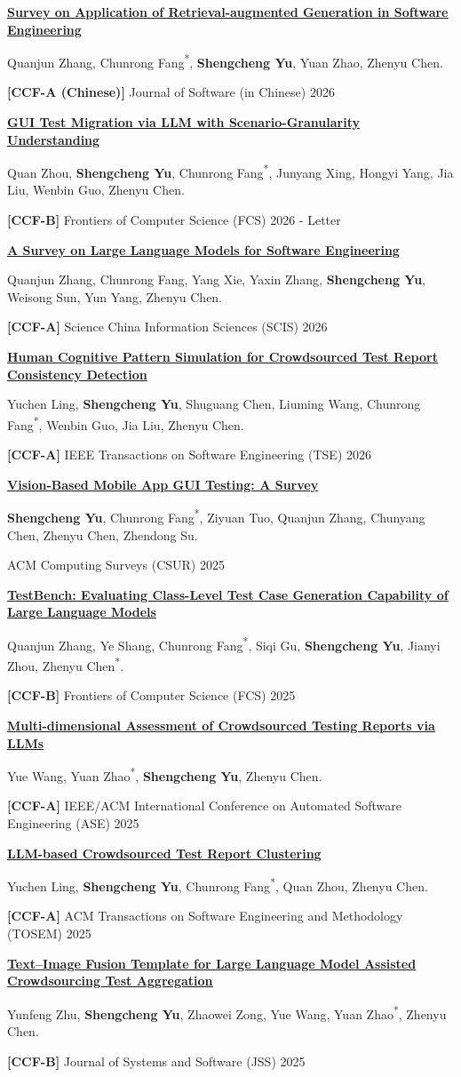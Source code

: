 \documentclass[12pt,a4paper]{article}
\newcommand{\me}{\textbf{Shengcheng Yu}}
\newcommand{\corr}{\textsuperscript{*}}
\newcommand{\ccf}[1]{\textbf{[#1]}}
\newcommand{\publication}[5]{%
  \begin{samepage}%
  \href{#5}{\textbf{\uline{#1}}}#2\par\nopagebreak[4]
  #3.\par\nopagebreak[4]
  #4\par
  \end{samepage}%
  \vspace{4.8pt}%
}
\begin{document}
\publication
{Survey on Application of Retrieval-augmented Generation in Software Engineering}
{}
{Quanjun Zhang, Chunrong Fang\corr, \me, Yuan Zhao, Zhenyu Chen}
{\ccf{CCF-A (Chinese)} Journal of Software (in Chinese) 2026}
{https://www.jos.org.cn/jos/article/abstract/7567}

\publication
{GUI Test Migration via LLM with Scenario-Granularity Understanding}
{}
{Quan Zhou, \me, Chunrong Fang\corr, Junyang Xing, Hongyi Yang, Jia Liu, Wenbin Guo, Zhenyu Chen}
{\ccf{CCF-B} Frontiers of Computer Science (FCS) 2026 - Letter}
{https://doi.org/10.1007/s11704-025-50270-x}

\publication
{A Survey on Large Language Models for Software Engineering}
{}
{Quanjun Zhang, Chunrong Fang, Yang Xie, Yaxin Zhang, \me, Weisong Sun, Yun Yang, Zhenyu Chen}
{\ccf{CCF-A} Science China Information Sciences (SCIS) 2026}
{https://doi.org/10.1007/s11432-025-4670-0}

\publication
{Human Cognitive Pattern Simulation for Crowdsourced Test Report Consistency Detection}
{}
{Yuchen Ling, \me, Shuguang Chen, Liuming Wang, Chunrong Fang\corr, Wenbin Guo, Jia Liu, Zhenyu Chen}
{\ccf{CCF-A} IEEE Transactions on Software Engineering (TSE) 2026}
{https://doi.org/10.1109/TSE.2026.3659293}

\publication
{Vision-Based Mobile App GUI Testing: A Survey}
{}
{\me, Chunrong Fang\corr, Ziyuan Tuo, Quanjun Zhang, Chunyang Chen, Zhenyu Chen, Zhendong Su}
{ACM Computing Surveys (CSUR) 2025}
{https://doi.org/10.1145/3773027}

\publication
{TestBench: Evaluating Class-Level Test Case Generation Capability of Large Language Models}
{}
{Quanjun Zhang, Ye Shang, Chunrong Fang\corr, Siqi Gu, \me, Jianyi Zhou, Zhenyu Chen\corr}
{\ccf{CCF-B} Frontiers of Computer Science (FCS) 2025}
{https://journal.hep.com.cn/fcs/EN/10.1007/s11704-025-50078-9}

\publication
{Multi-dimensional Assessment of Crowdsourced Testing Reports via LLMs}
{}
{Yue Wang, Yuan Zhao\corr, \me, Zhenyu Chen}
{\ccf{CCF-A} IEEE/ACM International Conference on Automated Software Engineering (ASE) 2025}
{https://doi.org/10.1109/ASE63991.2025.00150}

\publication
{LLM-based Crowdsourced Test Report Clustering}
{}
{Yuchen Ling, \me, Chunrong Fang\corr, Quan Zhou, Zhenyu Chen}
{\ccf{CCF-A} ACM Transactions on Software Engineering and Methodology (TOSEM) 2025}
{https://doi.org/10.1145/3765756}

\publication
{Text--Image Fusion Template for Large Language Model Assisted Crowdsourcing Test Aggregation}
{}
{Yunfeng Zhu, \me, Zhaowei Zong, Yue Wang, Yuan Zhao\corr, Zhenyu Chen}
{\ccf{CCF-B} Journal of Systems and Software (JSS) 2025}
{https://doi.org/10.1016/j.jss.2025.112478}
\end{document}
